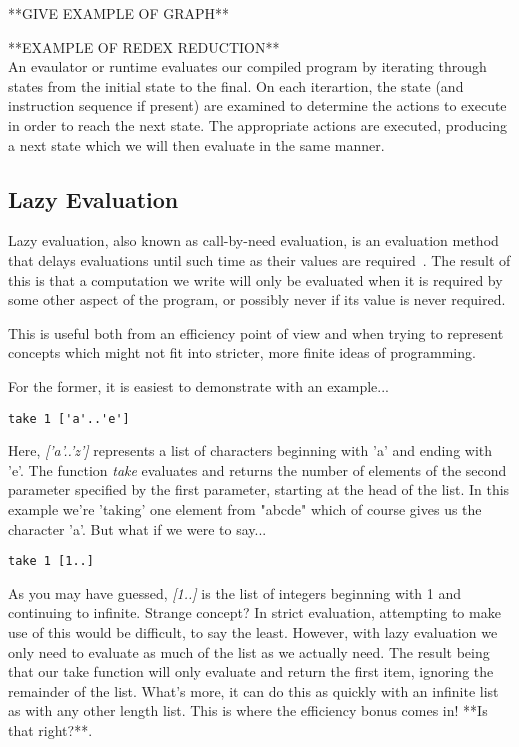 **GIVE EXAMPLE OF GRAPH**

**EXAMPLE OF REDEX REDUCTION** \\

An evaulator or runtime evaluates our compiled program by iterating through
states from the initial state to the final. On each iterartion, the state
(and instruction sequence if present) are examined to determine the actions
to execute in order to reach the next state. The appropriate actions are
executed, producing a next state which we will then evaluate in the same
manner. 

\subsection{Lazy Evaluation}
Lazy evaluation, also known as call-by-need evaluation, is an evaluation method
that delays evaluations until such time as their values are required~\cite[pp.33]{SPJ}. 
The result of this is that a computation we write will only be 
evaluated when it is required by some other aspect of the program, or possibly never
if its value is never required. 

This is useful both from an efficiency point of view and when trying to 
represent concepts which might not fit into stricter, more finite ideas of
programming. 

For the former, it is easiest to demonstrate with an example...
\begin{verbatim}
take 1 ['a'..'e']
\end{verbatim}
Here, \emph{['a'..'z']} represents a list of characters beginning with 'a' and 
ending with 'e'. The function \emph{take} evaluates and returns the number of
elements of the second parameter specified by the first parameter, starting at the
head of the list. In this example we're 'taking' one element from "abcde" which
of course gives us the character 'a'. But what if we were to say...
\begin{verbatim}
take 1 [1..]
\end{verbatim}
As you may have guessed, \emph{[1..]} is the list of integers beginning with 1
and continuing to infinite. Strange concept? In strict evaluation, attempting
to make use of this would be difficult, to say the least. However, with lazy 
evaluation we only need to evaluate as much of the list as we actually need.
The result being that our take function will only evaluate and return the 
first item, ignoring the remainder of the list. What's more, it can do this
as quickly with an infinite list as with any other length list. This is where the
efficiency bonus comes in! **Is that right?**. \\


